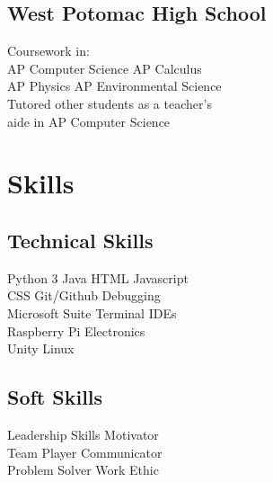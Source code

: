 \documentclass[]{deedy-resume-openfont}
\begin{document}
\begin{minipage}[t]{0.33\textwidth}
\subsection{West Potomac High School}
Coursework in:\\
AP Computer Science \textbullet{} AP Calculus\\
AP Physics \textbullet{} AP Environmental Science \\
Tutored other students as a teacher's\\
aide in AP Computer Science \\
\sectionsep


\section{Skills} 
\subsection{Technical Skills}
Python 3 \textbullet{} Java \textbullet{} HTML \textbullet{} Javascript \\
CSS \textbullet{} Git/Github \textbullet{} Debugging \\
Microsoft Suite \textbullet{} Terminal \textbullet{} IDEs \\
Raspberry Pi \textbullet{} Electronics \\
Unity \textbullet{} Linux \\
\sectionsep
\subsection{Soft Skills}
Leadership Skills \textbullet{} Motivator \\
Team Player \textbullet{} Communicator \\
Problem Solver \textbullet{} Work Ethic \\
\sectionsep

%
%

\end{minipage} 
\hfill
\end{document}
